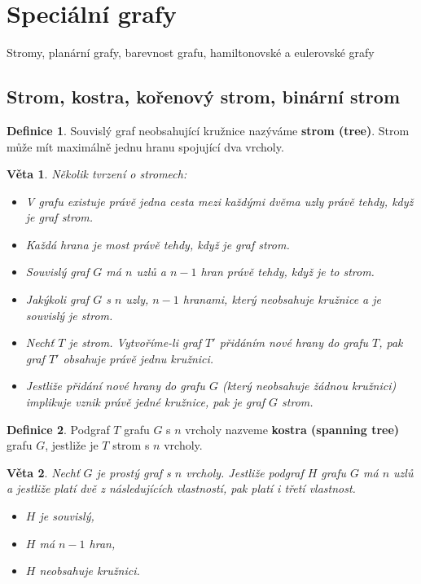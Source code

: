 \documentclass[a4]{report}
\newtheorem{theorem}{Věta}
\theoremstyle{definition}
\newtheorem{definition}{Definice}[section]
\begin{document}
\section{Speciální grafy}
Stromy, planární grafy, barevnost grafu, hamiltonovské a eulerovské grafy

\subsection{Strom, kostra, kořenový strom, binární strom}

\begin{definition}
Souvislý graf neobsahující kružnice nazýváme \textbf{strom (tree)}. Strom může mít maximálně jednu hranu spojující dva vrcholy.
\end{definition}


\begin{theorem}
Několik tvrzení o stromech:
\begin{itemize}
    \item V grafu existuje právě jedna cesta mezi každými dvěma uzly právě tehdy, když je graf strom.
    \item Každá hrana je most právě tehdy, když je graf strom.
    \item Souvislý graf $G$ má $n$ uzlů a $n-1$ hran právě tehdy, když je to strom.
    \item Jakýkoli graf $G$ s $n$ uzly, $n-1$ hranami, který neobsahuje kružnice a je souvislý je strom.
    \item Nechť $T$ je strom. Vytvoříme-li graf $T'$ přidáním nové hrany do grafu $T$, pak graf $T'$ obsahuje právě jednu kružnici.
    \item Jestliže přidání nové hrany do grafu $G$ (který neobsahuje žádnou kružnici) implikuje vznik právě jedné kružnice, pak je graf $G$ strom.
\end{itemize}
\end{theorem}

\begin{definition}
Podgraf $T$ grafu $G$ s $n$ vrcholy nazveme \textbf{kostra (spanning tree)} grafu $G$, jestliže je $T$ strom s $n$ vrcholy.
\end{definition}

\begin{theorem}
Nechť $G$ je prostý graf s $n$ vrcholy. Jestliže podgraf $H$ grafu $G$ má $n$ uzlů a jestliže platí dvě z následujících vlastností, pak platí i třetí vlastnost.
\begin{itemize}
    \item $H$ je souvislý,
    \item $H$ má $n-1$ hran,
    \item $H$ neobsahuje kružnici.
\end{itemize}
\end{theorem}
\end{document}
